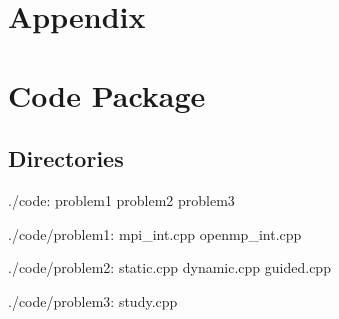 \documentclass[a4paper]{article}   %
\begin{document}
\begin{CJK}{UTF8}{gbsn}
\begin{spacing}{1.2}



\appendix
\section*{Appendix}
\section{Code Package}
\subsection{Directories}
./code:
problem1  problem2  problem3

./code/problem1:
mpi\_int.cpp openmp\_int.cpp

./code/problem2:
static.cpp dynamic.cpp guided.cpp

./code/problem3:
study.cpp

\end{spacing}
\end{CJK}
\end{document}
